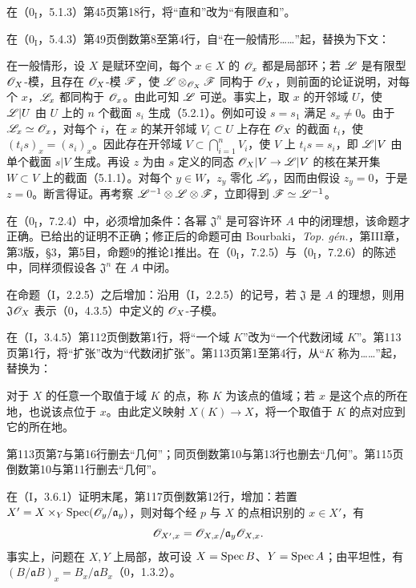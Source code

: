 在（$0_{\mathrm I}$，5.1.3）第45页第18行，将“直和”改为“有限直和”。

在（$0_{\mathrm I}$，5.4.3）第49页倒数第8至第4行，自“在一般情形……”起，替换为下文：

在一般情形，设 $X$ 是赋环空间，每个 $x\in X$ 的 $\mathscr O_x$ 都是局部环；若 $\mathscr L$ 是有限型 $\mathscr O_X$-模，且存在 $\mathscr O_X$-模 $\mathscr F$，使 $\mathscr L\otimes_{\mathscr O_X}\mathscr F$ 同构于 $\mathscr O_X$，则前面的论证说明，对每个 $x$，$\mathscr L_x$ 都同构于 $\mathscr O_x$。由此可知 $\mathscr L$ 可逆。事实上，取 $x$ 的开邻域 $U$，使 $\mathscr L|U$ 由 $U$ 上的 $n$ 个截面 $s_i$ 生成（5.2.1）。例如可设 $s=s_1$ 满足 $s_x\ne0$。由于 $\mathscr L_x\simeq\mathscr O_x$，对每个 $i$，在 $x$ 的某开邻域 $V_i\subset U$ 上存在 $\mathscr O_X$ 的截面 $t_i$，使 $(t_is)_x=(s_i)_x$。因此存在开邻域 $V\subset\bigcap_{i=1}^nV_i$，使 $V$ 上 $t_is=s_i$，即 $\mathscr L|V$ 由单个截面 $s|V$ 生成。再设 $z$ 为由 $s$ 定义的同态 $\mathscr O_X|V\to\mathscr L|V$ 的核在某开集 $W\subset V$ 上的截面（5.1.1）。对每个 $y\in W$，$z_y$ 零化 $\mathscr L_y$，因而由假设 $z_y=0$，于是 $z=0$。断言得证。再考察 $\mathscr L^{-1}\otimes\mathscr L\otimes\mathscr F$，立即得到 $\mathscr F\simeq\mathscr L^{-1}$。

在（$0_{\mathrm I}$，7.2.4）中，必须增加条件：各幂 $\mathfrak J^n$ 是可容许环 $A$ 中的闭理想，该命题才正确。已给出的证明不正确；修正后的命题可由 Bourbaki，\textit{Top. gén.}，第III章，第3版，§3，第5目，命题9的推论1推出。在（$0_{\mathrm I}$，7.2.5）与（$0_{\mathrm I}$，7.2.6）的陈述中，同样须假设各 $\mathfrak J^n$ 在 $A$ 中闭。

在命题（I，2.2.5）之后增加：沿用（I，2.2.5）的记号，若 $\mathfrak J$ 是 $A$ 的理想，则用 $\mathfrak J\mathscr O_X$ 表示（0，4.3.5）中定义的 $\mathscr O_X$-子模。

在（I，3.4.5）第112页倒数第1行，将“一个域 $K$”改为“一个代数闭域 $K$”。第113页第1行，将“扩张”改为“代数闭扩张”。第113页第1至第4行，从“$K$ 称为……”起，替换为：

对于 $X$ 的任意一个取值于域 $K$ 的点，称 $K$ 为该点的值域；若 $x$ 是这个点的所在地，也说该点位于 $x$。由此定义映射 $X(K)\to X$，将一个取值于 $K$ 的点对应到它的所在地。

第113页第7与第16行删去“几何”；同页倒数第10与第13行也删去“几何”。第115页倒数第10与第11行删去“几何”。

在（I，3.6.1）证明末尾，第117页倒数第12行，增加：若置 $X'=X\times_Y\operatorname{Spec}(\mathscr O_y/\mathfrak a_y)$，则对每个经 $p$ 与 $X$ 的点相识别的 $x\in X'$，有
\[
 \mathscr O_{X',x}=\mathscr O_{X,x}/\mathfrak a_y\mathscr O_{X,x}.
\]
事实上，问题在 $X,Y$ 上局部，故可设 $X=\operatorname{Spec} B$、$Y=\operatorname{Spec} A$；由平坦性，有 $(B/\mathfrak a B)_x=B_x/\mathfrak a B_x$（0，1.3.2）。

